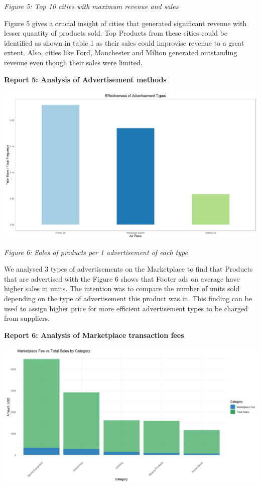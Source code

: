\documentclass[
  letterpaper,
  DIV=11,
  numbers=noendperiod]{scrartcl}
\begin{document}
\emph{Figure 5: Top 10 cities with maximum revenue and sales}

Figure 5 gives a crucial insight of cities that generated significant
revenue with lesser quantity of products sold. Top Products from these
cities could be identified as shown in table 1 as their sales could
improvise revenue to a great extent. Also, cities like Ford, Manchester
and Milton generated outstanding revenue even though their sales were
limited.

\textbf{Report 5: Analysis of Advertisement methods}

\includegraphics{images/Figure 4.jpeg}

\emph{Figure 6: Sales of products per 1 advertisement of each type}

We analysed 3 types of advertisements on the Marketplace to find that
Products that are advertised with the Figure 6 shows that Footer ads on
average have higher sales in units. The intention was to compare the
number of units sold depending on the type of advertisement this product
was in. This finding can be used to assign higher price for more
efficient advertisement types to be charged from suppliers.

\textbf{Report 6: Analysis of Marketplace transaction fees}

\includegraphics{images/Figure 5.jpeg}
\end{document}
